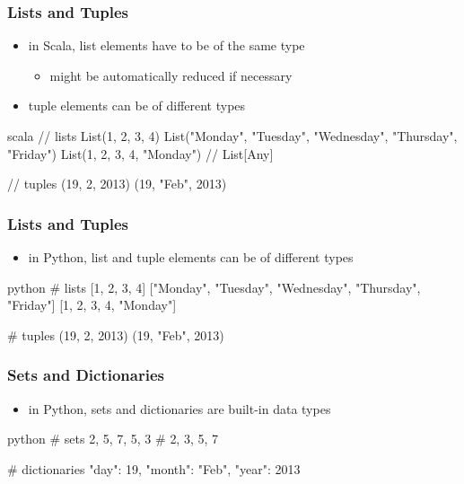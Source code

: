 \documentclass[dvipsnames]{beamer}
\theoremstyle{plain}
\begin{document}
\begin{frame}[fragile]
  \frametitle{Lists and Tuples}

  \begin{itemize}
    \item in Scala, list elements have to be of the same type
    \begin{itemize}
      \item might be automatically reduced if necessary
    \end{itemize}
    \item tuple elements can be of different types
  \end{itemize}

  \pause
  \begin{example}[Scala]
    \begin{pygments}{scala}
// lists
List(1, 2, 3, 4)
List("Monday", "Tuesday", "Wednesday", "Thursday", "Friday")
List(1, 2, 3, 4, "Monday")  // List[Any]

// tuples
(19, 2, 2013)
(19, "Feb", 2013)
    \end{pygments}
  \end{example}
\end{frame}

\begin{frame}[fragile]
  \frametitle{Lists and Tuples}

  \begin{itemize}
    \item in Python, list and tuple elements can be of different types
  \end{itemize}

  \pause
  \begin{example}[Python]
    \begin{pygments}{python}
# lists
[1, 2, 3, 4]
["Monday", "Tuesday", "Wednesday", "Thursday", "Friday"]
[1, 2, 3, 4, "Monday"]

# tuples
(19, 2, 2013)
(19, "Feb", 2013)
    \end{pygments}
  \end{example}
\end{frame}

\begin{frame}[fragile]
  \frametitle{Sets and Dictionaries}

  \begin{itemize}
    \item in Python, sets and dictionaries are built-in data types
  \end{itemize}

  \pause
  \begin{example}[Python]
    \begin{pygments}{python}
# sets
{2, 5, 7, 5, 3}         # {2, 3, 5, 7}

# dictionaries
{"day": 19, "month": "Feb", "year": 2013}
    \end{pygments}
  \end{example}
\end{frame}
\end{document}
